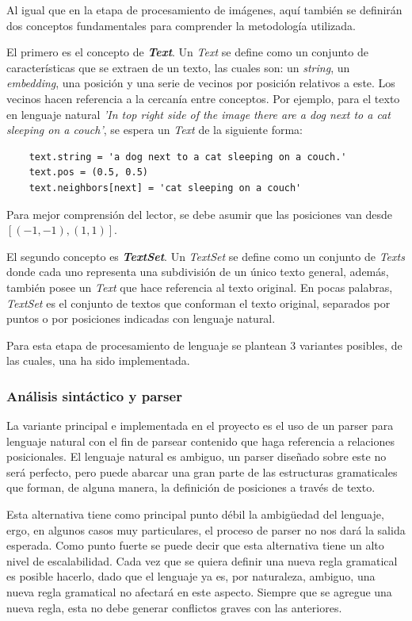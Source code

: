 Al igual que en la etapa de procesamiento de imágenes, aquí también se definirán dos conceptos fundamentales para comprender la metodología utilizada.

El primero es el concepto de \textit{\textbf{Text}}. Un \textit{Text} se define como un conjunto de características que se extraen de un texto, las cuales son: un \textit{string}, un \textit{embedding}, una posición y una serie de vecinos por posición relativos a este. Los vecinos hacen referencia a la cercanía entre conceptos. Por ejemplo, para el texto en lenguaje natural \textit{'In top right side of the image there are a dog next to a cat sleeping on a couch'}, se espera un \textit{Text} de la siguiente forma:

\begin{verbatim}
    text.string = 'a dog next to a cat sleeping on a couch.'
    text.pos = (0.5, 0.5)
    text.neighbors[next] = 'cat sleeping on a couch'
\end{verbatim}

Para mejor comprensi\'on del lector, se debe asumir que las posiciones van desde $[(-1,-1), (1,1)]$.

El segundo concepto es \textit{\textbf{TextSet}}. Un \textit{TextSet} se define como un conjunto de \textit{Texts} donde cada uno representa una subdivisi\'on de un \'unico texto general, además, también posee un \textit{Text} que hace referencia al texto original. En pocas palabras, \textit{TextSet} es el conjunto de textos que conforman el texto original, separados por puntos o por posiciones indicadas con lenguaje natural.

Para esta etapa de procesamiento de lenguaje se plantean 3 variantes posibles, de las cuales, una ha sido implementada.

\subsubsection{Análisis sintáctico y parser}
La variante principal e implementada en el proyecto es el uso de un parser para lenguaje natural con el fin de parsear contenido que haga referencia a relaciones posicionales. El lenguaje natural es ambiguo, un parser diseñado sobre este no será perfecto, pero puede abarcar una gran parte de las estructuras gramaticales que forman, de alguna manera, la definición de posiciones a través de texto.

Esta alternativa tiene como principal punto débil la ambigüedad del lenguaje, ergo, en algunos casos muy particulares, el proceso de parser no nos dará la salida esperada. Como punto fuerte se puede decir que esta alternativa tiene un alto nivel de escalabilidad. Cada vez que se quiera definir una nueva regla gramatical es posible hacerlo, dado que el lenguaje ya es, por naturaleza, ambiguo, una nueva regla gramatical no afectará en este aspecto. Siempre que se agregue una nueva regla, esta no debe generar conflictos graves con las anteriores.

